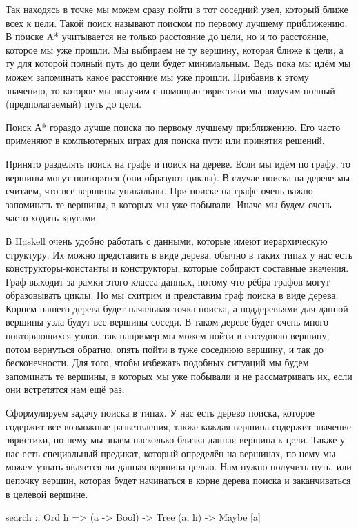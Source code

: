 Так находясь в точке  мы можем сразу пойти
в тот соседний узел, который ближе всех к цели.
Такой поиск называют поиском по первому лучшему приближению.
В поиске A* учитывается не только расстояние до цели, но и то
расстояние, которое мы уже прошли. Мы выбираем не ту вершину,
которая ближе к цели, а ту для которой полный путь до цели
будет минимальным. Ведь пока мы идём мы можем запоминать какое
расстояние мы уже прошли. Прибавив к этому значению, то
которое мы получим с помощью эвристики мы получим
полный (предполагаемый) путь до цели. 

Поиск А* гораздо лучше поиска по первому лучшему приближению.
Его часто применяют в компьютерных играх для поиска пути или
принятия решений. 

Принято разделять поиск на графе и поиск на дереве.
Если мы идём по графу, то вершины могут повторятся (они
образуют циклы). В случае поиска на дереве мы считаем, что
все вершины уникальны. При поиске на графе очень важно 
запоминать те вершины, в которых мы уже побывали. 
Иначе мы будем очень часто ходить кругами.

В Haskell очень удобно работать с данными, которые
имеют иерархическую структуру. Их 
можно представить в виде дерева, обычно в таких
типах у нас есть конструкторы-константы и конструкторы,
которые собирают составные значения. Граф выходит
за рамки этого класса данных, потому что рёбра графов 
могут образовывать циклы. Но мы схитрим и представим
граф поиска в виде дерева. Корнем нашего дерева
будет начальная точка поиска, а поддеревьями для 
данной вершины узла будут все вершины-соседи.
В таком дереве будет очень много повторяющихся
узлов, так например мы можем пойти в соседнюю 
вершину, потом вернуться обратно, опять пойти
в туже соседнюю вершину, и так до бесконечности.
Для того, чтобы избежать подобных ситуаций
мы будем запоминать те вершины, в которых мы 
уже побывали и не рассматривать их, если они
встретятся нам ещё раз. 

Сформулируем задачу поиска в типах. У нас есть
дерево поиска, которое содержит все возможные
разветвления, также каждая вершина содержит 
значение эвристики, по нему мы знаем насколько
близка данная вершина к цели. Также у нас есть
специальный предикат, который определён на вершинах,
по нему мы можем узнать является ли данная вершина 
целью. Нам нужно получить путь, или цепочку 
вершин, которая будет начинаться в корне дерева поиска 
и заканчиваться в целевой вершине. 

\begin{code}
search :: Ord h => (a -> Bool) -> Tree (a, h) -> Maybe [a]
\end{code}

